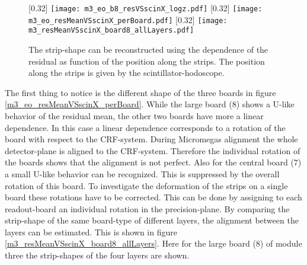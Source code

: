 \documentclass[
twoside,            %
BCOR1.4cm,          %
10pt,               %
headings=normal,    %
headsepline,        %
clearplainpage,		%
final,              %
div=14,
open=right,
bibliography=toc
]{scrreprt}
\begin{document}
\begin{figure}[!h]
	\centering
	[0.32\textwidth]
	{\texttt{[image: m3\_eo\_b8\_resVSscinX\_logz.pdf]}}
	\hfill
	[0.32\textwidth]
	{\texttt{[image: m3\_eo\_resMeanVSscinX\_perBoard.pdf]}}
	\hfill
	[0.32\textwidth]
	{\texttt{[image: m3\_resMeanVSscinX\_board8\_allLayers.pdf]}}
	\vspace{-2mm}
	\caption{
		The strip-shape can be reconstructed using the dependence of the residual as function of the position along the strips.
		The position along the strips is given by the scintillator-hodoscope.
	}
	\label{stripShapePrinciple} 
\end{figure}

The first thing to notice is the different shape of the three boards in figure \ref{m3_eo_resMeanVSscinX_perBoard}.
While the large board (8) shows a U-like behavior of the residual mean, the other two boards have more a linear dependence.
In this case a linear dependence corresponds to a rotation of the board with respect to the CRF-system.
During Micromegas alignment the whole detector-plane is aligned to the CRF-system.
Therefore the individual rotation of the boards shows that the alignment is not perfect.
Also for the central board (7) a small U-like behavior can be recognized.
This is suppressed by the overall rotation of this board.
To investigate the deformation of the strips on a single board these rotations have to be corrected.
This can be done by assigning to each readout-board an individual rotation in the precision-plane.
By comparing the strip-shape of the same board-type of different layers, the alignment between the layers can be estimated.
This is shown in figure \ref{m3_resMeanVSscinX_board8_allLayers}.
Here for the large board (8) of module three the strip-shapes of the four layers are shown.
\end{document}
